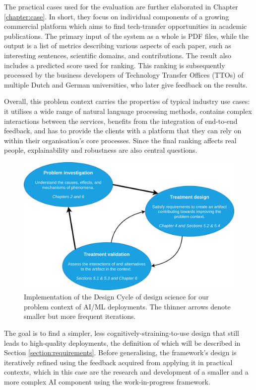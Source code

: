 The practical cases used for the evaluation are further elaborated in Chapter \ref{chapter:case}. In short, they focus on individual components of a growing commercial platform which aims to find tech-transfer opportunities in academic publications. The primary input of the system as a whole is PDF files, while the output is a list of metrics describing various aspects of each paper, such as interesting sentences, scientific domains, and contributions. The result also includes a predicted score used for ranking. This ranking is subsequently processed by the business developers of Technology Transfer Offices (TTOs) of multiple Dutch and German universities, who later give feedback on the results.

Overall, this problem context carries the properties of typical industry use cases: it utilises a wide range of natural language processing methods, contains complex interactions between the services, benefits from the integration of end-to-end feedback, and has to provide the clients with a platform that they can rely on within their organisation's core processes. Since the final ranking affects real people, explainability and robustness are also central questions.

\begin{figure}
    \centering
    \includegraphics[width=.85\linewidth]{figures/design-cycle.drawio.png}
    \captionsetup{width=.9\linewidth}
    \caption{Implementation of the Design Cycle of design science \cite{wieringa2014design} for our problem context of AI/ML deployments. The thinner arrows denote smaller but more frequent iterations.}
    \label{fig:design-cycle}
\end{figure}

The goal is to find a simpler, less cognitively-straining-to-use design that still leads to high-quality deployments, the definition of which will be described in Section \ref{section:requirements}. Before generalising, the framework's design is iteratively refined using the feedback acquired from applying it in practical contexts, which in this case are the research and development of a smaller and a more complex AI component using the work-in-progress framework. 

